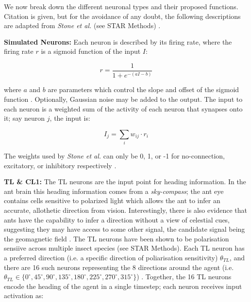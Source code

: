 \documentclass[a4paper,11pt,twoside,openright]{article}
\begin{document}
We now break down the different neuronal types and their proposed functions.
Citation is given, but for the avoidance of any doubt, the following descriptions
are adapted from \textit{Stone et al.} (see STAR Methods) \cite{Stone2017}.
\newline
\par

\textbf{Simulated Neurons:}
Each neuron is described by its firing rate, where the firing rate $r$ is
a sigmoid function of the input $I$:

\begin{equation}
r = \frac{1}{1 + e^{-(aI - b)}}
\end{equation}

where $a$ and $b$ are parameters which control the slope and offset of the
sigmoid function \cite{Stone2017}. Optionally, Gaussian noise may be added
to the output. The input to each neuron is a weighted sum of the activity
of each neuron that synapses onto it; say neuron $j$, the input is:

\begin{equation}
  I_j = \sum_{i} w_{ij} \cdot r_i
\end{equation}

The weights used by \textit{Stone et al.} can only be 0, 1, or -1 for
no-connection, excitatory, or inhibitory respectively \cite{Stone2017}.
\newline
\par

\textbf{TL \& CL1:}
The TL neurons are the input point for heading information. In the ant brain
this heading information comes from a \textit{sky-compass}; the ant eye contains
cells sensitive to polarized light which allows the ant to infer an accurate,
allothetic direction from vision. Interestingly, there is also evidence that ants
have the capability to infer a direction without a view of celestial cues,
suggesting they may have access to some other signal, the candidate signal being
the geomagnetic field \cite{Fleischmann2018, Grob2017}. The TL neurons have been
shown to be polarisation sensiive across multiple insect species \cite{Stone2017}
(see STAR Methods). Each TL neuron has a preferred direction (i.e. a specific
direction of poliarisation sensitivity) $\theta_{TL} $, and there are 16 such
neurons representing the 8 directions around the agent (i.e.
$\theta_{TL} \in \{ 0^{\circ}, 45^{\circ}, 90^{\circ}, 135^{\circ}, 180^{\circ},
225^{\circ}, 270^{\circ}, 315^{\circ}\} $) \cite{Stone2017}. Together, the 16
TL neurons encode the heading of the agent in a single timestep; each neuron
receives input activation as:
\end{document}
